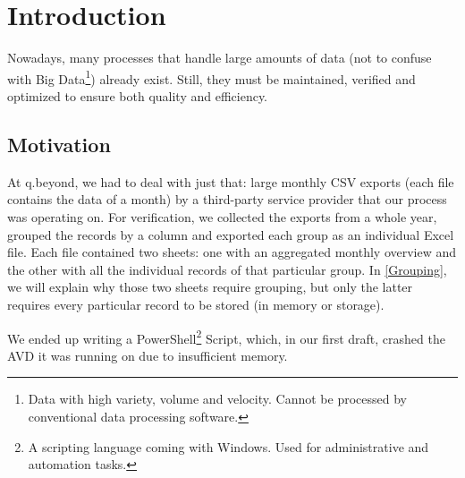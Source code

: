 \setcounter{page}{1}
\pagestyle{fancy}
\fancyhf{}
\fancyhead[R]{\thepage}
\renewcommand{\headrulewidth}{0pt} %

\section{Introduction}
Nowadays, many processes that handle large amounts of data (not to confuse with Big Data\footnote{Data
with high variety, volume and velocity. Cannot be processed by conventional data processing software.})
already exist. Still, they must be maintained, verified and optimized to ensure both
quality and efficiency.

\subsection{Motivation} \label{Motivation}
At q.beyond, we had to deal with just that: large monthly CSV exports
(each file contains the data of a month) by a third-party service provider
that our process was operating on. For verification, we collected the exports from a whole year,
grouped the records by a column and exported each group as an individual Excel file.
Each file contained two sheets: one with an aggregated monthly overview and the other with all the
individual records of that particular group.
In \ref{Grouping}, we will explain why those
two sheets require grouping, but only the latter requires every particular record to be stored
(in memory or storage).


We ended up writing a PowerShell\footnote{A scripting language coming with Windows. Used for administrative and automation tasks.}
Script, which, in our first draft, crashed the \gls{AVD}
it was running on due to insufficient memory.

